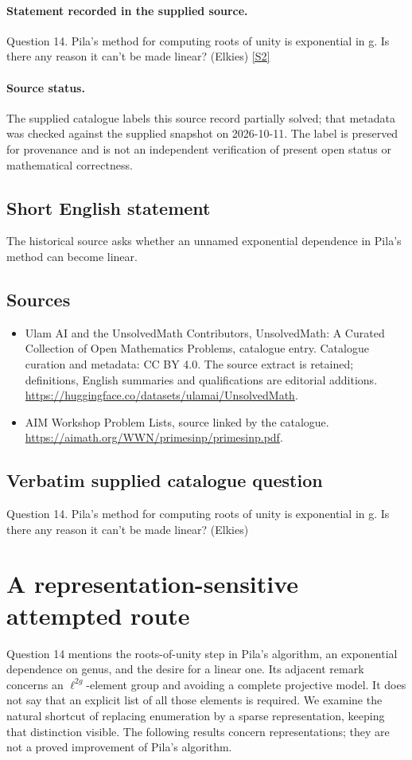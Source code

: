 \documentclass[11pt]{article}
\begin{document}
\paragraph{Statement recorded in the supplied source.}
Question 14. Pila's method for computing roots of unity is exponential in g. Is there any reason it can't be made linear? (Elkies) \href{https://aimath.org/WWN/primesinp/primesinp.pdf}{[S2]}
\paragraph{Source status.}
The supplied catalogue labels this source record partially solved; that metadata was checked against the supplied snapshot on 2026-10-11. The label is preserved for provenance and is not an independent verification of present open status or mathematical correctness.
\subsection{Short English statement}
The historical source asks whether an unnamed exponential dependence in Pila's method can become linear.
\subsection{Sources}
\begin{itemize}
\item[S1] Ulam AI and the UnsolvedMath Contributors, UnsolvedMath: A Curated Collection of Open Mathematics Problems, catalogue entry. Catalogue curation and metadata: CC BY 4.0. The source extract is retained; definitions, English summaries and qualifications are editorial additions.
\url{https://huggingface.co/datasets/ulamai/UnsolvedMath}.
\item[S2] AIM Workshop Problem Lists, source linked by the catalogue.
\url{https://aimath.org/WWN/primesinp/primesinp.pdf}.
\end{itemize}
\subsection{Verbatim supplied catalogue question}
Question 14. Pila's method for computing roots of unity is exponential in g. Is there any reason it can't be made linear? (Elkies)

\section{A representation-sensitive attempted route}
Question 14 mentions the roots-of-unity step in Pila's algorithm,
an exponential dependence on genus, and the desire for a linear one.
Its adjacent remark concerns an $\ell^{2g}$-element group and avoiding
a complete projective model. It does not say that an explicit list
of all those elements is required. We examine the natural shortcut
of replacing enumeration by a sparse representation, keeping that
distinction visible. The following results concern representations;
they are not a proved improvement of Pila's algorithm.
\end{document}
